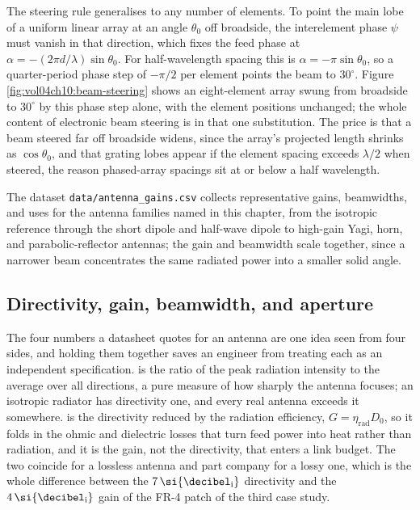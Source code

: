 The steering rule generalises to any number of elements. To point the
main lobe of a uniform linear array at an angle $\theta_{0}$ off
broadside, the interelement phase $\psi$ must vanish in that direction,
which fixes the feed phase at $\alpha = -(2\pi d/\lambda)\sin\theta_{0}$.
For half-wavelength spacing this is $\alpha = -\pi\sin\theta_{0}$, so a
quarter-period phase step of $-\pi/2$ per element points the beam to
$30^{\circ}$. Figure \ref{fig:vol04ch10:beam-steering} shows an
eight-element array swung from broadside to $30^{\circ}$ by this phase
step alone, with the element positions unchanged; the whole content of
electronic beam steering is in that one substitution. The price is that a
beam steered far off broadside widens, since the array's projected length
shrinks as $\cos\theta_{0}$, and that grating lobes appear if the element
spacing exceeds $\lambda/2$ when steered, the reason phased-array spacings
sit at or below a half wavelength.





The dataset \texttt{data/antenna\_gains.csv} collects representative
gains, beamwidths, and uses for the antenna families named in this
chapter, from the isotropic reference through the short dipole and
half-wave dipole to high-gain Yagi, horn, and parabolic-reflector
antennas; the gain and beamwidth scale together, since a narrower beam
concentrates the same radiated power into a smaller solid angle.

\subsection{Directivity, gain, beamwidth, and aperture}

The four numbers a datasheet quotes for an antenna are one idea seen from
four sides, and holding them together saves an engineer from treating each
as an independent specification.  is the ratio of the
peak radiation intensity to the average over all directions, a pure measure
of how sharply the antenna focuses; an isotropic radiator has directivity
one, and every real antenna exceeds it somewhere.  is the
directivity reduced by the radiation efficiency, $G = \eta_{\text{rad}} D_0$,
so it folds in the ohmic and dielectric losses that turn feed power into
heat rather than radiation, and it is the gain, not the directivity, that
enters a link budget. The two coincide for a lossless antenna and part
company for a lossy one, which is the whole difference between the
$7\,\si{\decibel\textsubscript{i}}$ directivity and the
$4\,\si{\decibel\textsubscript{i}}$ gain of the FR-4 patch of the third
case study.

